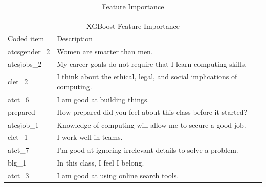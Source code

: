 \setlength{\extrarowheight}{1.5pt}
\begin{table}[!htbp]
\caption{Feature Importance} %
\centering %
\begin{tabular}{|l|l|} %
\hline %


\multicolumn{2}{|c|}{}\\
\multicolumn{2}{|c|}{XGBoost Feature Importance}\\[5pt]
\hline
Coded item & Description\\[0.5ex]
\hline %

atcsgender\_2 &  Women are smarter than men. \\
atcsjobs\_2 & My career goals do not require that I learn computing skills. \\
clet\_2 &  I think about the ethical, legal, and social implications of computing.\\
atct\_6 & I am good at building things.\\
prepared & How prepared did you feel about this class before it started? \\
atcsjob\_1 & Knowledge of computing will allow me to secure a good job. \\
clet\_1 & I work well in teams. \\
atct\_7 & I’m good at ignoring irrelevant details to solve a problem. \\
blg\_1 & In this class, I feel I belong. \\
atct\_3 &  I am good at using online search tools. \\

\hline%
\end{tabular}
\label{tableFeatureImportance}{}
\end{table}

